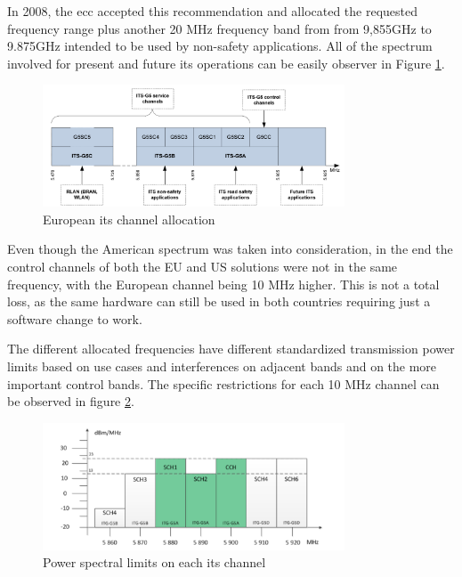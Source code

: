 In 2008, the \gls{ecc} accepted this recommendation and allocated the requested frequency range plus another 20 MHz frequency band from from 9,855GHz to 9.875GHz intended to be used by non-safety applications\cite{harri_multi-channel_2015}\cite{asselin-miller_study_2016}. All of the spectrum involved for present and future \gls{its} operations can be easily observer in Figure \ref{fig:EU_channels}.

\begin{figure}[htbp]
    \centering
    \includegraphics[width=0.8\textwidth]{Chapters/Figures/VANETs/European_its_channels.png}
   	\caption{European \gls{its} channel allocation~\cite{soriga_its-g5_2012}}
   	\label{fig:EU_channels}
\end{figure}

Even though the American spectrum was taken into consideration, in the end the control channels of both the EU and US solutions were not in the same frequency, with the European channel being 10 MHz higher. This is not a total loss, as the same hardware can still be used in both countries requiring just a software change to work\cite{harri_multi-channel_2015}\cite{asselin-miller_study_2016}.

The different allocated frequencies have different standardized transmission power limits based on use cases and interferences on adjacent bands and on the more important control bands\cite{festag_cooperative_2014}. The specific restrictions for each 10 MHz channel can be observed in figure \ref{fig:EU_channet_restriction}.

\begin{figure}[htbp]
    \centering
    \includegraphics[width=0.8\textwidth]{Chapters/Figures/VANETs/European_its_channels_restrictions.png}
   	\caption{Power spectral limits on each \gls{its} channel~\cite{harri_multi-channel_2015}}
   	\label{fig:EU_channet_restriction}
\end{figure}


